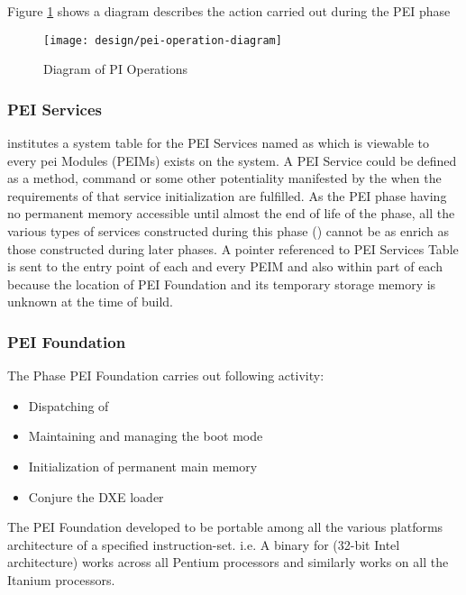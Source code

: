 Figure \ref{fig:design-pei-operation-diagram} shows a diagram describes the action carried out during the PEI phase

\begin{figure}[h]
	\centering
	\texttt{[image: design/pei-operation-diagram]}
	\caption{Diagram of PI Operations}\label{fig:design-pei-operation-diagram}
\end{figure}

\subsubsection{PEI Services}
 institutes a system table for the PEI Services named as  which is viewable to every \gls{pei} Modules (PEIMs) exists on the system. A PEI Service could be defined as a method, command or some other potentiality manifested by the  when the requirements of that service initialization are fulfilled. As the PEI phase having no permanent memory accessible until almost the end of life of the phase, all the various types of services constructed during this phase () cannot be as enrich as those constructed during later phases. A pointer referenced to PEI Services Table is sent to the entry point of each and every PEIM and also within part of each  because the location of PEI Foundation and its temporary storage memory is unknown at the time of build. 

\subsubsection{PEI Foundation}
The Phase PEI Foundation carries out following activity:
\begin{itemize}
	\item Dispatching of 
	\item Maintaining and managing the boot mode
	\item Initialization of permanent main memory
	\item Conjure the DXE loader 
\end{itemize}
The PEI Foundation developed to be portable among all the various platforms architecture of a specified instruction-set. i.e. A binary for  (32-bit Intel architecture) works across all Pentium processors and similarly  works on all the Itanium processors.

